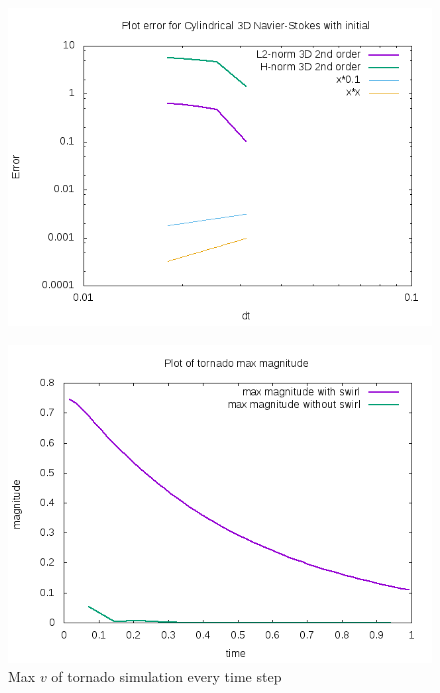 \documentclass{beamer}
\begin{document}
\begin{frame}
\begin{figure}
	\centering
	\includegraphics[width=0.9\linewidth]{NS_3D/error_tornado}
	\caption{}
	\label{fig:errortornado}
\end{figure}
\end{frame}

\begin{frame}
\begin{figure}
	\centering
	\includegraphics[width=0.9\linewidth]{NS_3D/magnitude_tornado}
	\caption{Max $ v $ of tornado simulation every time step}
	\label{fig:magnitudetornado}
\end{figure}
\end{frame}
\end{document}
